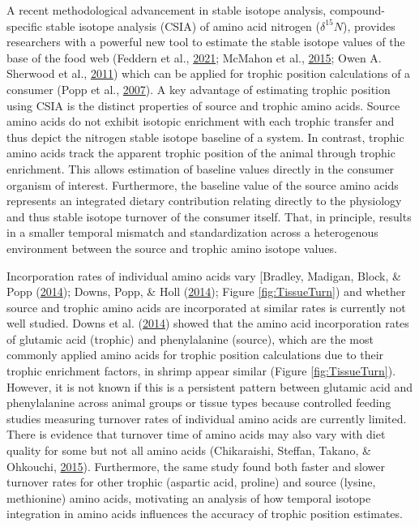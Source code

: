 \documentclass [11pt, proquest] {uwthesis}[2015/03/03]
\begin{document}
A recent methodological advancement in stable isotope analysis,
compound-specific stable isotope analysis (CSIA) of amino acid nitrogen
(\(\delta^{15}N\)), provides researchers with a powerful new tool to
estimate the stable isotope values of the base of the food web (Feddern
et al., \protect\hyperlink{ref-Feddern2021}{2021}; McMahon et al.,
\protect\hyperlink{ref-McMahon2015}{2015}; Owen A. Sherwood et al.,
\protect\hyperlink{ref-Sherwood2011}{2011}) which can be applied for
trophic position calculations of a consumer (Popp et al.,
\protect\hyperlink{ref-Popp2007}{2007}). A key advantage of estimating
trophic position using CSIA is the distinct properties of source and
trophic amino acids. Source amino acids do not exhibit isotopic
enrichment with each trophic transfer and thus depict the nitrogen
stable isotope baseline of a system. In contrast, trophic amino acids
track the apparent trophic position of the animal through trophic
enrichment. This allows estimation of baseline values directly in the
consumer organism of interest. Furthermore, the baseline value of the
source amino acids represents an integrated dietary contribution
relating directly to the physiology and thus stable isotope turnover of
the consumer itself. That, in principle, results in a smaller temporal
mismatch and standardization across a heterogenous environment between
the source and trophic amino isotope values.

Incorporation rates of individual amino acids vary {[}Bradley, Madigan,
Block, \& Popp (\protect\hyperlink{ref-Bradley2014}{2014}); Downs, Popp,
\& Holl (\protect\hyperlink{ref-Downs2014}{2014}); Figure
\ref{fig:TissueTurn}) and whether source and trophic amino acids are
incorporated at similar rates is currently not well studied. Downs et
al. (\protect\hyperlink{ref-Downs2014}{2014}) showed that the amino acid
incorporation rates of glutamic acid (trophic) and phenylalanine
(source), which are the most commonly applied amino acids for trophic
position calculations due to their trophic enrichment factors, in shrimp
appear similar (Figure \ref{fig:TissueTurn}). However, it is not known
if this is a persistent pattern between glutamic acid and phenylalanine
across animal groups or tissue types because controlled feeding studies
measuring turnover rates of individual amino acids are currently
limited. There is evidence that turnover time of amino acids may also
vary with diet quality for some but not all amino acids (Chikaraishi,
Steffan, Takano, \& Ohkouchi,
\protect\hyperlink{ref-Chikaraishi2015}{2015}). Furthermore, the same
study found both faster and slower turnover rates for other trophic
(aspartic acid, proline) and source (lysine, methionine) amino acids,
motivating an analysis of how temporal isotope integration in amino
acids influences the accuracy of trophic position estimates.
\end{document}
